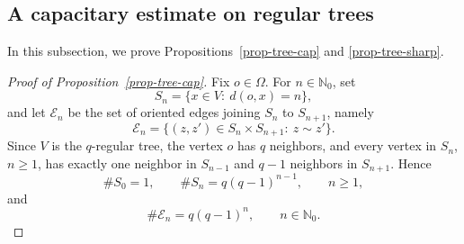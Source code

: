 \documentclass[twoside,12pt,letter]{article}
\theoremstyle{plain}
\theoremstyle{definition}
\theoremstyle{remark}
\numberwithin{equation}{section}
\begin{document}
\subsection{A capacitary estimate on regular trees}

In this subsection, we prove Propositions~\ref{prop-tree-cap} and \ref{prop-tree-sharp}. 

\begin{proof}[Proof of Proposition~\ref{prop-tree-cap}]
Fix \(o\in\Omega\). For \(n\in\mathbb{N}_0\), set
\[
S_n=\{x\in V:\ d(o,x)=n\},
\]
and let \(\mathcal{E}_n\) be the set of oriented edges joining \(S_n\) to
\(S_{n+1}\), namely
\[
\mathcal{E}_n
=
\bigl\{(z,z')\in S_n\times S_{n+1}:\ z\sim z'\bigr\}.
\]
Since \(V\) is the \(q\)-regular tree, the vertex \(o\) has \(q\) neighbors,
and every vertex in \(S_n\), \(n\ge 1\), has exactly one neighbor in
\(S_{n-1}\) and \(q-1\) neighbors in \(S_{n+1}\). Hence
\begin{equation}\label{ppt1}
\#S_0=1,\qquad
\#S_n=q(q-1)^{n-1},\qquad n\ge 1,
\end{equation}
and
\begin{equation}\label{ppt2}
\#\mathcal{E}_n=q(q-1)^n,\qquad n\in\mathbb{N}_0.
\end{equation}


\end{proof}
\end{document}
